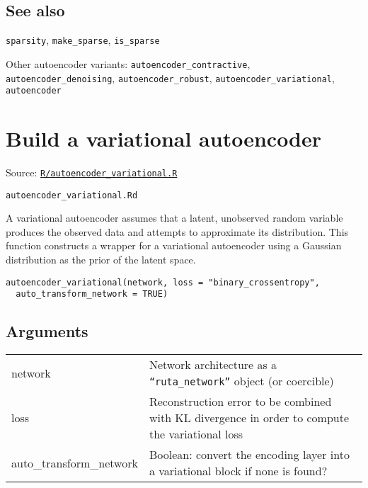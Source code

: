 \hypertarget{see-also}{\subsection{\texorpdfstring{\protect\hyperlink{see-also}{}See
also}{See also}}\label{see-also}}

\texttt{sparsity}, \texttt{make\_sparse}, \texttt{is\_sparse}

Other autoencoder variants: \texttt{autoencoder\_contractive},
\texttt{autoencoder\_denoising}, \texttt{autoencoder\_robust},
\texttt{autoencoder\_variational}, \texttt{autoencoder}

\section{Build a variational
autoencoder}\label{build-a-variational-autoencoder}

Source:
\href{https://github.com/fdavidcl/ruta/blob/master/R/autoencoder_variational.R}{\texttt{R/autoencoder\_variational.R}}

\texttt{autoencoder\_variational.Rd}

A variational autoencoder assumes that a latent, unobserved random
variable produces the observed data and attempts to approximate its
distribution. This function constructs a wrapper for a variational
autoencoder using a Gaussian distribution as the prior of the latent
space.

\begin{verbatim}
autoencoder_variational(network, loss = "binary_crossentropy",
  auto_transform_network = TRUE)
\end{verbatim}

\hypertarget{arguments}{\subsection{\texorpdfstring{\protect\hyperlink{arguments}{}Arguments}{Arguments}}\label{arguments}}

\begin{longtable}[c]{@{}>{\small}p{3cm}>{\raggedright}p{12.5cm}@{}}
\toprule
network & Network architecture as a \texttt{``ruta\_network''} object (or
coercible)\tabularnewline
loss & Reconstruction error to be combined with KL divergence in order
to compute the variational loss\tabularnewline
auto\_transform\_network & Boolean: convert the encoding layer into a
variational block if none is found?\tabularnewline
\bottomrule
\end{longtable}

